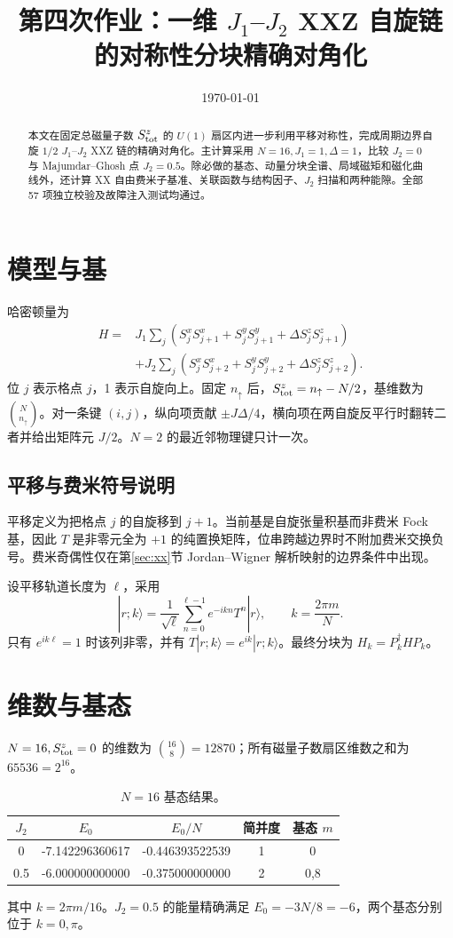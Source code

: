 \documentclass[11pt,a4paper]{ctexart}
\title{第四次作业：一维 $J_1$--$J_2$ XXZ 自旋链的对称性分块精确对角化}
\author{}
\date{\today}
\begin{document}
\maketitle

\begin{abstract}
本文在固定总磁量子数 $S^z_{\rm tot}$ 的 $U(1)$ 扇区内进一步利用平移对称性，完成周期边界自旋 $1/2$ $J_1$--$J_2$ XXZ 链的精确对角化。主计算采用 $N=16,J_1=1,\Delta=1$，比较 $J_2=0$ 与 Majumdar--Ghosh 点 $J_2=0.5$。除必做的基态、动量分块全谱、局域磁矩和磁化曲线外，还计算 XX 自由费米子基准、关联函数与结构因子、$J_2$ 扫描和两种能隙。全部 57 项独立校验及故障注入测试均通过。
\end{abstract}

\section{模型与基}
哈密顿量为
\begin{align}
H={}&J_1\sum_j\left(S_j^xS_{j+1}^x+S_j^yS_{j+1}^y+\Delta S_j^zS_{j+1}^z\right)\\
&+J_2\sum_j\left(S_j^xS_{j+2}^x+S_j^yS_{j+2}^y+\Delta S_j^zS_{j+2}^z\right).
\end{align}
位 $j$ 表示格点 $j$，1 表示自旋向上。固定 $n_\uparrow$ 后，$S^z_{\rm tot}=n_\uparrow-N/2$，基维数为 $\binom{N}{n_\uparrow}$。对一条键 $(i,j)$，纵向项贡献 $\pm J\Delta/4$，横向项在两自旋反平行时翻转二者并给出矩阵元 $J/2$。$N=2$ 的最近邻物理键只计一次。

\subsection{平移与费米符号说明}
平移定义为把格点 $j$ 的自旋移到 $j+1$。当前基是自旋张量积基而非费米 Fock 基，因此 $T$ 是非零元全为 $+1$ 的纯置换矩阵，位串跨越边界时不附加费米交换负号。费米奇偶性仅在第\ref{sec:xx}节 Jordan--Wigner 解析映射的边界条件中出现。

设平移轨道长度为 $\ell$，采用
\begin{equation}
|r;k\rangle=\frac1{\sqrt\ell}\sum_{n=0}^{\ell-1}e^{-ikn}T^n|r\rangle,
\qquad k=\frac{2\pi m}{N}.
\end{equation}
只有 $e^{ik\ell}=1$ 时该列非零，并有 $T|r;k\rangle=e^{ik}|r;k\rangle$。最终分块为 $H_k=P_k^\dagger HP_k$。

\section{维数与基态}
$N=16,S^z_{\rm tot}=0$ 的维数为 $\binom{16}{8}=12870$；所有磁量子数扇区维数之和为 $65536=2^{16}$。
\begin{table}[H]
\centering
\caption{$N=16$ 基态结果。}
\begin{tabular}{ccccc}
\toprule
$J_2$ & $E_0$ & $E_0/N$ & 简并度 & 基态 $m$ \\
\midrule
0 & -7.142296360617 & -0.446393522539 & 1 & 0 \\
0.5 & -6.000000000000 & -0.375000000000 & 2 & 0,8 \\
\bottomrule
\end{tabular}
\end{table}
其中 $k=2\pi m/16$。$J_2=0.5$ 的能量精确满足 $E_0=-3N/8=-6$，两个基态分别位于 $k=0,\pi$。
\end{document}
